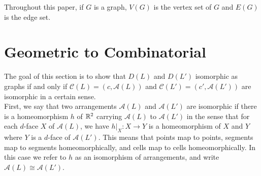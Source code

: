 \documentclass[11pt, oneside]{article}
\begin{document}
Throughout this paper, if $G$ is a graph, $V(G)$ is the vertex set of $G$ and $E(G)$ is the edge set.

\section{Geometric to Combinatorial}
The goal of this section is to show that $D(L)$ and $D(L')$ isomorphic as graphs if and only if $\mathcal{C}(L) = (c, \mathcal{A}(L))$ and $\mathcal{C}(L') = (c', \mathcal{A}(L'))$ are isomorphic in a certain sense.\\

 First, we say that two arrangements $\mathcal{A }(L)$ and $\mathcal{A} (L')$ are isomorphic if there is a homeomorphism $h$ of $\mathbb{R}^2$ carrying $\mathcal{A }(L)$ to $\mathcal{A} (L')$ in the sense that for each $d$-face $X$ of $\mathcal{A}(L)$, we have $h|_X: X \to Y$ is a homeomorphism of $X$ and $Y$ where $Y$ is a $d$-face of $\mathcal{A}(L')$. This means that points map to points, segments map to segments homeomorphically, and cells map to cells homeomorphically. In this case we refer to $h$ as an isomorphism of arrangements, and write $\mathcal{A }(L) \cong \mathcal{A} (L')$. \\
\end{document}
